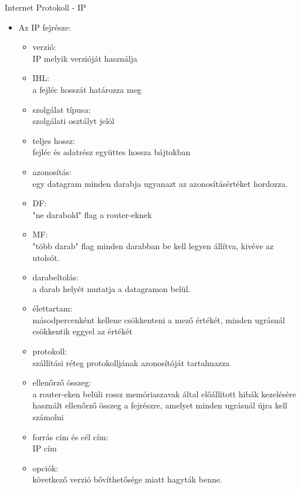 \documentclass[margin=0px]{article}
\begin{document}
\begin{description}
        Internet Protokoll - IP
        \begin{itemize}
            \item Az IP fejrésze:
                  \begin{itemize}
                      \item verzió:\\
                            IP melyik verzióját használja
                      \item IHL: \\
                            a fejléc hosszát határozza meg
                      \item szolgálat típusa: \\
                            szolgálati osztályt jelöl
                      \item teljes hossz: \\
                            fejléc és adatrész együttes hossza bájtokban
                      \item azonosítás: \\
                            egy datagram minden darabja ugyanazt az azonosításértéket hordozza.
                      \item DF: \\
                            "ne darabold" flag a router-eknek
                      \item MF: \\
                            "több darab" flag minden darabban be kell legyen állítva, kivéve az utolsót.
                      \item darabeltolás: \\
                            a darab helyét mutatja a datagramon belül.
                      \item élettartam: \\
                            másodpercenként kellene csökkenteni a mező értékét, minden ugrásnál csökkentik eggyel az értékét
                      \item protokoll: \\
                            szállítási réteg protokolljának azonosítóját tartalmazza
                      \item ellenőrző összeg: \\
                            a router-eken belüli rossz memóriaszavak által előállított hibák kezelésére használt ellenőrző összeg a fejrészre, amelyet minden ugrásnál újra kell számolni
                      \item forrás cím és cél cím: \\
                            IP cím
                      \item opciók: \\
                            következő verzió bővíthetősége miatt hagyták benne.
                  \end{itemize}


\end{itemize}
\end{description}
\end{document}
